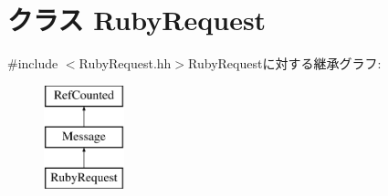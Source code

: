 \hypertarget{classRubyRequest}{
\section{クラス RubyRequest}
\label{classRubyRequest}
}


{\ttfamily \#include $<$RubyRequest.hh$>$}RubyRequestに対する継承グラフ:\begin{figure}[H]
\begin{center}
\leavevmode
\includegraphics[height=3cm]{classRubyRequest}
\end{center}
\end{figure}

